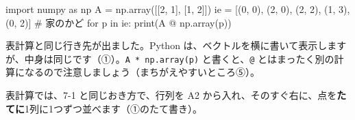 \noindent\begin{minipage}[t]{0.64\linewidth}\vspace{0pt}
\begin{bkcode}[Python]
import numpy as np
A = np.array([[2, 1],
              [1, 2]])
ie = [(0, 0), (2, 0), (2, 2),
      (1, 3), (0, 2)]     \# 家のかど
for p in ie:
    print(A @ np.array(p))
\end{bkcode}
\end{minipage}\hfill
\begin{minipage}[t]{0.32\linewidth}\vspace{0pt}
\begin{bkcodeout}[実行結果]
[0 0]
[4 2]
[6 6]
[5 7]
[2 4]
\end{bkcodeout}
\end{minipage}\par\vspace{3pt}
表計算と同じ行き先が出ました。Python は、ベクトルを横に書いて表示しますが、中身は同じです（①）。\texttt{A * np.array(p)} と書くと、\texttt{@} とはまったく別の計算になるので注意しましょう（まちがえやすいところ⑤）。

表計算では、7-1 と同じおき方で、行列を A2 から入れ、そのすぐ右に、点を\textbf{たてに}1列に1つずつ並べます（①のたて書き）。

